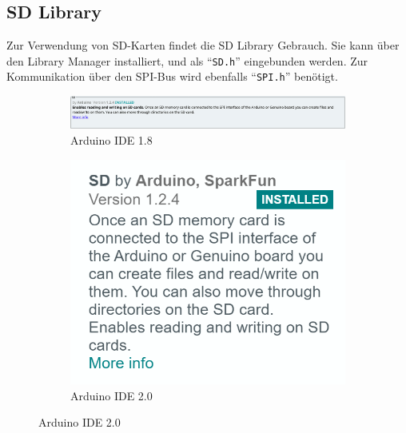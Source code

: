 \documentclass[ngerman]{schoolPres}
\begin{document}
  \subsection{SD Library}%
  \begin{frame}
    Zur Verwendung von SD-Karten findet die SD Library Gebrauch.
    Sie kann über den Library Manager installiert, und als \enquote{\texttt{SD.h}} eingebunden werden.
    Zur Kommunikation über den SPI-Bus wird ebenfalls \enquote{\texttt{SPI.h}} benötigt.


    \vfill
    \begin{figure}[!ht]
      \centering
      \begin{subfigure}{.75\linewidth}
        \includegraphics[width=\linewidth]{media/sd-lib.png}
        \caption{Arduino IDE 1.8}
      \end{subfigure}\hspace{1.5em}
      \begin{subfigure}{.2\linewidth}
        \includegraphics[width=\linewidth]{media/sd-lib-ide2.png}
        \caption{Arduino IDE 2.0}
      \end{subfigure}
    \end{figure}
    \begin{center}
    \end{center}
  \end{frame}
\end{document}

